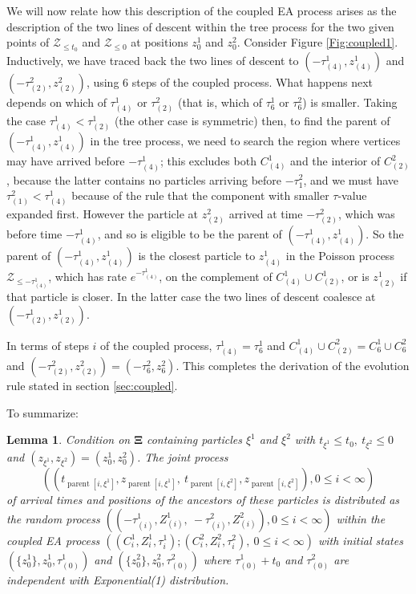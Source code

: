 \documentclass[12pt]{article}
\newtheorem{Lemma}{Lemma}
\newcommand{\ZZ}{\mbox{${\mathcal Z}$}}
\DeclareMathOperator{\parent}{parent}
\begin{document}
We will now relate how this description of the coupled EA process arises as the description of the two lines of descent 
within the tree process for the two given points of $\ZZ_{\le t_0}$  and  $\ZZ_{\le 0}$  at positions $z^1_0$ and $z^2_0$.
Consider Figure \ref{Fig:coupled1}.
Inductively, we have traced back the two lines of descent to 
$(-\tau^1_{(4)},z^1_{(4)})$ and $(-\tau^2_{(2)},z^2_{(2)})$, using $6$ steps of the coupled process.
What happens next depends on which of $\tau^1_{(4)}$ or $\tau^2_{(2)}$ (that is, which of $\tau^1_6$ or $\tau^2_6$) 
is smaller.  
Taking the case $\tau^1_{(4)} < \tau^1_{(2)}$ 
(the other case is symmetric) then, 
to find the parent of $(-\tau^1_{(4)},z^1_{(4)})$ in the tree process,
 we need to search the region where vertices may have arrived before 
$-\tau^1_{(4)}$; this excludes both $C^1_{(4)}$ and the interior of 
$C^2_{(2)}$, because the latter contains no particles arriving before 
$-\tau^2_1$, and we must have $\tau^2_{(1)} < \tau^1_{(4)}$ because 
of the rule that the component with smaller $\tau$-value expanded first.
However the particle at $z^2_{(2)}$ arrived at time $-\tau^2_{(2)}$, 
which was before time
$-\tau^1_{(4)}$, and so is eligible to be the parent of $(-\tau^1_{(4)},z^1_{(4)})$.
So the parent of $(-\tau^1_{(4)},z^1_{(4)})$ is the closest particle to $z^1_{(4)}$ in the 
Poisson process $\ZZ_{ \le - \tau^1_{(4)}}$, which has rate $e^{-\tau^1_{(4)}}$, on the complement 
of $C^1_{(4)} \cup C^1_{(2)}$, or is $z^1_{(2)}$ if that particle is closer. 
In the latter case the two lines of descent coalesce at 
$(-\tau^1_{(2)},z^1_{(2)})$.

In terms of steps $i$ of the coupled process, $\tau^1_{(4)} = \tau^1_6$ and
$C^1_{(4)} \cup C^2_{(2)} =  C^1_6 \cup C^2_6$ and 
$(-\tau^2_{(2)},z^2_{(2)}) = (-\tau^2_6,z^2_6)$.
This completes the derivation of the evolution rule stated 
in section \ref{sec:coupled}.

To summarize:
\begin{Lemma}
\label{L:line_descent_2}
Condition on $\bm{\Xi}$ containing  particles $\xi^1$ and $\xi^2$ with $t_{\xi^1} \le t_0, \ t_{\xi^2} \le 0$ and $(z_{\xi ^1}, z_{\xi^2}) = (z^1_0, z^2_0)$.  
The joint process 
\[((t_{\parent[i,\xi^1]}, z_{\parent[i,\xi^1]},   \  t_{\parent[i,\xi^2]}, z_{\parent[i,\xi^2]}), 0 \le i < \infty)\]
 of arrival times and positions of the ancestors of these particles 
is distributed as the random process 
$((-\tau^1_{(i)}, Z^1_{(i)},  \  -\tau^2_{(i)}, Z^2_{(i)}),  0 \le i < \infty)$ within
the coupled EA process 
$((C^1_i,Z^1_i,\tau^1_i); ( C^2_i,Z^2_i,\tau^2_i) , \   0 \le i < \infty)$ with initial states 
$(\{z^1_0\}, z^1_0, \tau^1_{(0)})$ and  $(\{z^2_0\}, z^2_0, \tau^2_{(0)})$
where  $\tau^1_{(0)} + t_0$ and  $ \tau^2_{(0)}$ are independent with Exponential(1) distribution.
\end{Lemma} 
\end{document}
